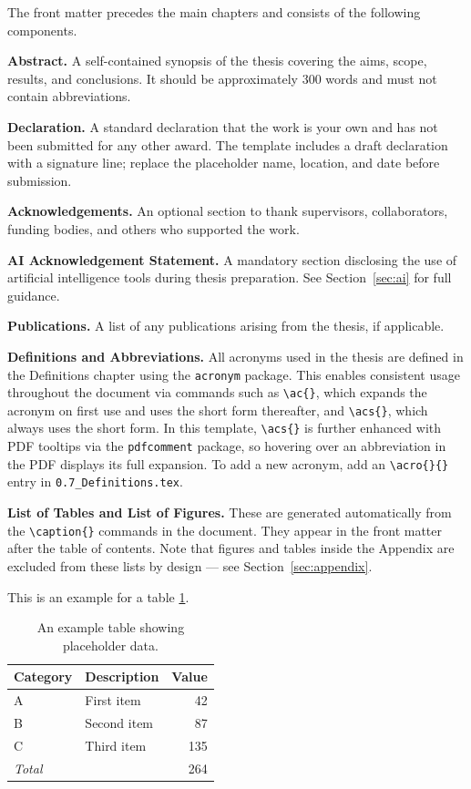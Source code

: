 The front matter precedes the main chapters and consists of the following components.

\textbf{Abstract.} A self-contained synopsis of the thesis covering the aims, scope, results, and conclusions. It should be approximately 300 words and must not contain abbreviations.

\textbf{Declaration.} A standard declaration that the work is your own and has not been submitted for any other award. The template includes a draft declaration with a signature line; replace the placeholder name, location, and date before submission.

\textbf{Acknowledgements.} An optional section to thank supervisors, collaborators, funding bodies, and others who supported the work.

\textbf{AI Acknowledgement Statement.} A mandatory section disclosing the use of artificial intelligence tools during thesis preparation. See Section~\ref{sec:ai} for full guidance.

\textbf{Publications.} A list of any publications arising from the thesis, if applicable.

\textbf{Definitions and Abbreviations.} All acronyms used in the thesis are defined in the Definitions chapter using the \texttt{acronym} package. This enables consistent usage throughout the document via commands such as \verb|\ac{}|, which expands the acronym on first use and uses the short form thereafter, and \verb|\acs{}|, which always uses the short form. In this template, \verb|\acs{}| is further enhanced with PDF tooltips via the \texttt{pdfcomment} package, so hovering over an abbreviation in the PDF displays its full expansion. To add a new acronym, add an \verb|\acro{}{}| entry in \texttt{0.7\_Definitions.tex}.

\textbf{List of Tables and List of Figures.} These are generated automatically from the \verb|\caption{}| commands in the document. They appear in the front matter after the table of contents. Note that figures and tables inside the Appendix are excluded from these lists by design --- see Section~\ref{sec:appendix}.

This is an example for a table \ref{tab:example_table}.

\begin{table}[ht]
    \centering
    \caption{An example table showing placeholder data.}
    \label{tab:example_table}
    \begin{tabular}{llr}
        \toprule
        \textbf{Category} & \textbf{Description} & \textbf{Value} \\
        \midrule
        A & First item  & 42  \\
        B & Second item & 87  \\
        C & Third item  & 135 \\
        \midrule
        \multicolumn{2}{l}{\textit{Total}} & 264 \\
        \bottomrule
    \end{tabular}
\end{table}


